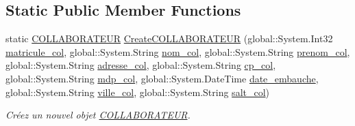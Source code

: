 \subsection*{Static Public Member Functions}
\begin{DoxyCompactItemize}
\item 
static \hyperlink{class_model_1_1_c_o_l_l_a_b_o_r_a_t_e_u_r}{C\-O\-L\-L\-A\-B\-O\-R\-A\-T\-E\-U\-R} \hyperlink{class_model_1_1_c_o_l_l_a_b_o_r_a_t_e_u_r_a47fd17271ba7b48a0ab533fe4d56cd3c}{Create\-C\-O\-L\-L\-A\-B\-O\-R\-A\-T\-E\-U\-R} (global\-::\-System.\-Int32 \hyperlink{class_model_1_1_c_o_l_l_a_b_o_r_a_t_e_u_r_a1d528bb5e6dab9aee87ec0498efce970}{matricule\-\_\-col}, global\-::\-System.\-String \hyperlink{class_model_1_1_c_o_l_l_a_b_o_r_a_t_e_u_r_a16da434fc2d5fd237a9c10011c7240ad}{nom\-\_\-col}, global\-::\-System.\-String \hyperlink{class_model_1_1_c_o_l_l_a_b_o_r_a_t_e_u_r_a653654accc486107577cbe805db1e1dc}{prenom\-\_\-col}, global\-::\-System.\-String \hyperlink{class_model_1_1_c_o_l_l_a_b_o_r_a_t_e_u_r_a3a3c271af8a2fa7f9d2d8f5600fb8e56}{adresse\-\_\-col}, global\-::\-System.\-String \hyperlink{class_model_1_1_c_o_l_l_a_b_o_r_a_t_e_u_r_a264f8faf4646f7748ff732d79a4e54fd}{cp\-\_\-col}, global\-::\-System.\-String \hyperlink{class_model_1_1_c_o_l_l_a_b_o_r_a_t_e_u_r_a2099c578d33f2851b0a914aeca8a3234}{mdp\-\_\-col}, global\-::\-System.\-Date\-Time \hyperlink{class_model_1_1_c_o_l_l_a_b_o_r_a_t_e_u_r_afa00e01e2baf6b90075dd32abfd0b72f}{date\-\_\-embauche}, global\-::\-System.\-String \hyperlink{class_model_1_1_c_o_l_l_a_b_o_r_a_t_e_u_r_a52fce134f10bc131943353de60abd8cf}{ville\-\_\-col}, global\-::\-System.\-String \hyperlink{class_model_1_1_c_o_l_l_a_b_o_r_a_t_e_u_r_ae5aa55abe9ea993f8533e563a91485e0}{salt\-\_\-col})
\begin{DoxyCompactList}\small\item\em Créez un nouvel objet \hyperlink{class_model_1_1_c_o_l_l_a_b_o_r_a_t_e_u_r}{C\-O\-L\-L\-A\-B\-O\-R\-A\-T\-E\-U\-R}. \end{DoxyCompactList}\end{DoxyCompactItemize}
